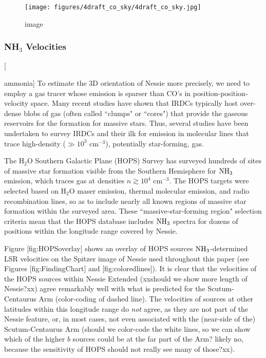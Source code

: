 \documentclass[]{article}
\begin{document}
\begin{figure}[htbp]
\centering
\texttt{[image: figures/4draft\_co\_sky/4draft\_co\_sky.jpg]}
\caption{image}
\end{figure}

\subsubsection{NH$_3$ Velocities}

{[}

ammonia{]} To estimate the 3D orientation of Nessie more precisely, we
need to employ a gas tracer whose emission is sparser than CO's in
position-position-velocity space. Many recent studies have shown that
IRDCs typically host over-dense blobs of gas (often called ``clumps" or
``cores") that provide the gaseous reservoirs for the formation for
massive stars. Thus, several studies have been undertaken to survey
IRDCs and their ilk for emission in molecular lines that trace
high-density ($\gg 10^3$ cm$^{-3}$), potentially star-forming, gas.

The H$_2$O Southern Galactic Plane (HOPS) Survey \citep{Purcell2012b}
has surveyed hundreds of sites of massive star formation visible from
the Southern Hemisphere for ${\rm NH}_3$ emission, which traces gas at
densities $n\gtrsim 10^4$ cm$^{-3}$. The HOPS targets were selected
based on H$_2$O maser emission, thermal molecular emission, and radio
recombination lines, so as to include nearly all known regions of
massive star formation within the surveyed area. These
``massive-star-forming region" selection criteria mean that the HOPS
database includes ${\rm NH}_3$ spectra for dozens of positions within
the longitude range covered by Nessie.

Figure {[}fig:HOPSoverlay{]} shows an overlay of HOPS sources
${\rm NH}_3$-determined LSR velocities on the Spitzer image of Nessie
used throughout this paper (see Figures {[}fig:FindingChart{]} and
{[}fig:coloredlines{]}). It is clear that the velocities of the HOPS
sources within Nessie Extended (xxshould we show more length of
Nessie?xx) agree remarkably well with what is predicted for the
Scutum-Centaurus Arm (color-coding of dashed line). The velocities of
sources at other latitudes within this longitude range do \emph{not}
agree, as they are not part of the Nessie feature, or, in most cases,
not even associated with the (near-side of the) Scutum-Centaurus Arm
(should we color-code the white lines, so we can show which of the
higher $b$ sources could be at the far part of the Arm? likely no,
because the sensitivity of HOPS should not really see many of those?xx).
\end{document}
